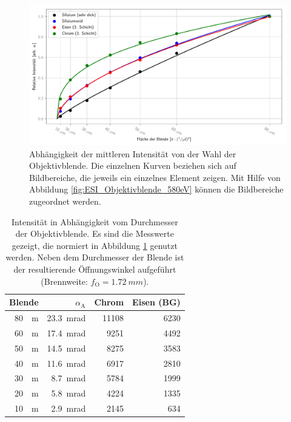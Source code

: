 \documentclass[
	paper=a4,				%
	twoside=true,			%
	BCOR=6mm,				%
	fontsize=12pt,			%
	pagesize=auto,			%
	numbers=noenddot,		%
	bibliography=totoc,		%
	draft=false
]{scrartcl}
\begin{document}
\begin{figure}
	\centering
	\includegraphics[width=1\linewidth]{../../Jupyter-Notebooks/AnhangC/Bilder/ESI_Objektivblende}
	\caption{Abhängigkeit der mittleren Intensität von der Wahl der Objektivblende. Die einzelnen Kurven beziehen sich auf Bildbereiche, die jeweils ein einzelnes Element zeigen. Mit Hilfe von Abbildung \ref{fig:ESI_Objektivblende_580eV} können die Bildbereiche zugeordnet werden.}
	\label{fig:ESI_Objektivblende}
\end{figure}

\begin{table}
	\centering
	\caption{Intensität in Abhängigkeit vom Durchmesser der Objektivblende. Es sind die Messwerte gezeigt, die normiert in Abbildung \ref{fig:ESI_Objektivblende} genutzt werden. Neben dem Durchmesser der Blende ist der resultierende Öffnungswinkel aufgeführt (Brennweite: $f_\mathrm{O}=\SI{1,72}{mm}$).}
	\begin{tabular}{|r|r|r|r|}
		\hline 
		Blende & $\alpha_\mathrm{A}$ & Chrom & Eisen (BG) \\ 
		\hline 
		\SI{80}{\mu\meter} & \SI{23,3}{mrad} & 11108 & 6230 \\ 
		\hline 
		\SI{60}{\mu\meter} & \SI{17,4}{mrad} & 9251 & 4492 \\ 
		\hline 
		\SI{50}{\mu\meter} & \SI{14,5}{mrad} & 8275 & 3583 \\ 
		\hline 
		\SI{40}{\mu\meter} & \SI{11,6}{mrad} & 6917 & 2810 \\ 
		\hline 
		\SI{30}{\mu\meter} & \SI{8,7}{mrad} & 5784 & 1999 \\ 
		\hline 
		\SI{20}{\mu\meter} & \SI{5,8}{mrad} & 4224 & 1335 \\ 
		\hline 
		\SI{10}{\mu\meter} & \SI{2,9}{mrad} & 2145 & 634 \\ 
		\hline 
	\end{tabular} 
	\label{tab:ESI_Objektivblende}
\end{table}
\end{document}
